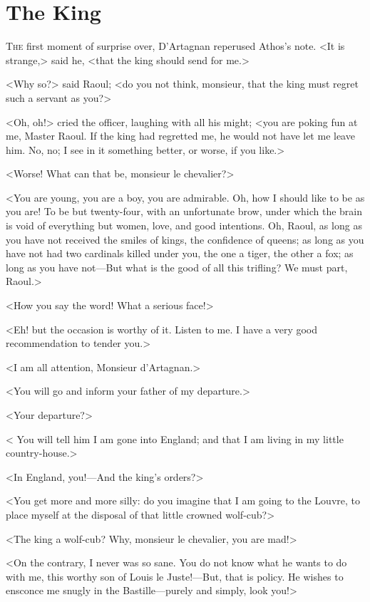 \chapter{The King}

\lettrine{T}{he} first moment of surprise over, D'Artagnan reperused Athos's note. <It is strange,> said he, <that the king should send for me.>

\zz
<Why so?> said Raoul; <do you not think, monsieur, that the king must regret such a servant as you?>

\zz
<Oh, oh!> cried the officer, laughing with all his might; <you are poking fun at me, Master Raoul. If the king had regretted me, he would not have let me leave him. No, no; I see in it something better, or worse, if you like.>

<Worse! What can that be, monsieur le chevalier?>

<You are young, you are a boy, you are admirable. Oh, how I should like to be as you are! To be but twenty-four, with an unfortunate brow, under which the brain is void of everything but women, love, and good intentions. Oh, Raoul, as long as you have not received the smiles of kings, the confidence of queens; as long as you have not had two cardinals killed under you, the one a tiger, the other a fox; as long as you have not—But what is the good of all this trifling? We must part, Raoul.>

<How you say the word! What a serious face!>

<Eh! but the occasion is worthy of it. Listen to me. I have a very good recommendation to tender you.>

<I am all attention, Monsieur d'Artagnan.>

<You will go and inform your father of my departure.>

<Your departure?>

< You will tell him I am gone into England; and that I am living in my little country-house.>

<In England, you!—And the king's orders?>

<You get more and more silly: do you imagine that I am going to the Louvre, to place myself at the disposal of that little crowned wolf-cub?>

<The king a wolf-cub? Why, monsieur le chevalier, you are mad!>

<On the contrary, I never was so sane. You do not know what he wants to do with me, this worthy son of Louis le Juste!—But,  that is policy. He wishes to ensconce me snugly in the Bastille—purely and simply, look you!>

